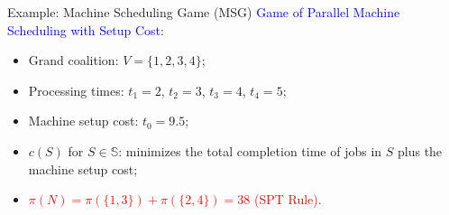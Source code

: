 \documentclass[14pt]{beamer}
\begin{document}
\begin{frame}{Example: Machine Scheduling Game (MSG)}
\small
\textcolor{blue}{Game of Parallel Machine Scheduling with Setup Cost:}
\vspace{2mm}
	\begin{itemize}
	\justifying
		\item Grand coalition: $V = \big\{ 1,2,3,4 \big\}$;
		\item Processing times: $t_1=2$, $t_2=3$, $t_3=4$, $t_4=5$;
		\item Machine setup cost: $t_0 = 9.5$;
		\item $c(S)$ for $S\in \mathbb{S}$:  minimizes the total completion time of jobs in $S$ plus the machine setup cost;
		\item \textcolor{red}{$\pi(N)= \pi(\{1,3\}) + \pi(\{2,4\})= 38$ (SPT Rule).}

\vspace{6pt}
{
\centering
{}
\par
}

\end{itemize}
\end{frame}
\end{document}
